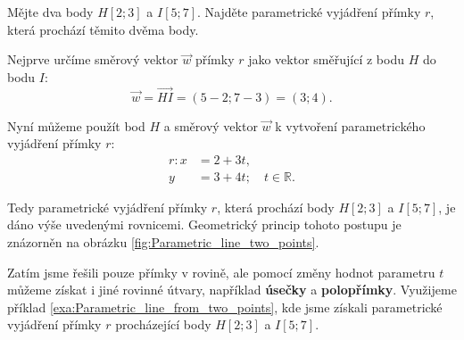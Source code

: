 \begin{example}\label{exa:Parametric_line_from_two_points}
    Mějte dva body $H[2; 3]$ a $I[5; 7]$.
    Najděte parametrické vyjádření přímky $r$, která prochází těmito dvěma body.

    Nejprve určíme směrový vektor $\vec{w}$ přímky $r$ jako vektor směřující z bodu $H$ do bodu $I$:
    \[
        \vec{w} = \overrightarrow{HI} = (5 - 2; 7 - 3) = (3; 4).
    \]

    Nyní můžeme použít bod $H$ a směrový vektor $\vec{w}$ k vytvoření parametrického vyjádření přímky $r$:
    \begin{align*}
        r: x &= 2 + 3t, \\
           y &= 3 + 4t; \quad t \in \mathbb{R}.
    \end{align*}

    Tedy parametrické vyjádření přímky $r$, která prochází body $H[2; 3]$ a $I[5; 7]$, je dáno výše uvedenými rovnicemi.
    Geometrický princip tohoto postupu je znázorněn na obrázku \ref{fig:Parametric_line_two_points}.
\end{example}

Zatím jsme řešili pouze přímky v rovině, ale pomocí změny hodnot parametru $t$ můžeme získat i jiné rovinné útvary, například \textbf{úsečky} a \textbf{polopřímky}.
Využijeme příklad \ref{exa:Parametric_line_from_two_points}, kde jsme získali parametrické vyjádření přímky $r$ procházející body $H[2; 3]$ a $I[5; 7]$.

